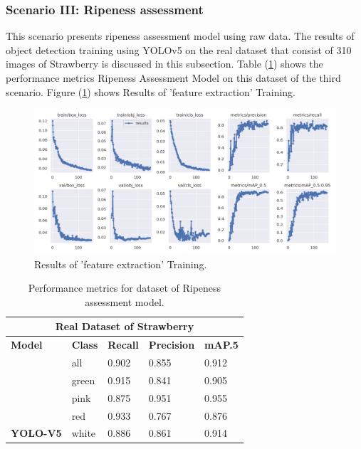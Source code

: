 \subsubsection{Scenario III: Ripeness assessment}

This scenario presents  ripeness assessment model using raw data. 
The results of object detection training using YOLOv5 on the real 
dataset that consist of 310 images of Strawberry  is discussed in 
this subsection. Table (\ref{tab:preform3}) shows the performance metrics Ripeness 
Assessment Model on this dataset of the third scenario.
Figure (\ref{fig:resultTrain}) shows Results of 'feature extraction' Training.

\begin{figure}[H]
  \centering
  \includegraphics[width=\textwidth]{photos/chapter05/23.png}
  \caption{Results of 'feature extraction' Training.}
  \label{fig:resultTrain}
\end{figure}

\begin{table}[H]
  \setlength\arrayrulewidth{0.5pt}
  \renewcommand{\arraystretch}{1.5}
  \begin{tabularx}{\textwidth}{|p{3.4cm}|X|X|X|X|}
      \hline
      \multicolumn{5}{|c|}{\textbf{Real Dataset of Strawberry}} \\ \hline
      \textbf{Model} & \textbf{Class} & \textbf{Recall} & \textbf{Precision} & \textbf{mAP\@.5} \\ \hline
      & all & 0.902 & 0.855 & 0.912 \\ \cline{2-5}
      & green & 0.915 & 0.841 & 0.905 \\ \cline{2-5}
      & pink & 0.875 & 0.951 & 0.955 \\ \cline{2-5}
      & red & 0.933 & 0.767 & 0.876 \\ \cline{2-5}
      \multirow{-5}{*}{\textbf{YOLO-V5}} & white & 0.886 & 0.861 & 0.914 \\ \hline
  \end{tabularx}
  \caption{Performance metrics for dataset of Ripeness assessment model.}
  \label{tab:preform3}
\end{table}

